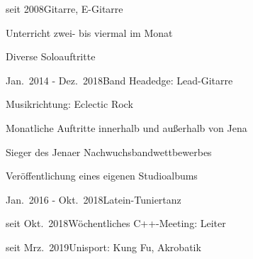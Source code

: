 \documentclass[a4paper,8pt]{cv}
\begin{document}
    \vspace{-1em}
    \begin{multicols}{2}
      \begin{cvTimeItem}{seit 2008}{Gitarre, E-Gitarre}
        \begin{cvItemize}
          \item Unterricht zwei- bis viermal im Monat
          \item Diverse Soloauftritte
        \end{cvItemize}
      \end{cvTimeItem}
      \begin{cvTimeItem}{Jan.~2014 - Dez.~2018}{Band Headedge: Lead-Gitarre}
        \begin{cvItemize}
          \item Musikrichtung: Eclectic Rock
          \item Monatliche Auftritte innerhalb und außerhalb von Jena
          \item Sieger des Jenaer Nachwuchsbandwettbewerbes
          \item Veröffentlichung eines eigenen Studioalbums
        \end{cvItemize}
      \end{cvTimeItem}
      \begin{cvTimeItem}{Jan.~2016 - Okt.~2018}{Latein-Tuniertanz}
      \end{cvTimeItem}
      \begin{cvTimeItem}{seit Okt.~2018}{Wöchentliches C++-Meeting: Leiter}
      \end{cvTimeItem}
      \begin{cvTimeItem}{seit Mrz.~2019}{Unisport: Kung Fu, Akrobatik}
      \end{cvTimeItem}
    \end{multicols}
\end{document}
